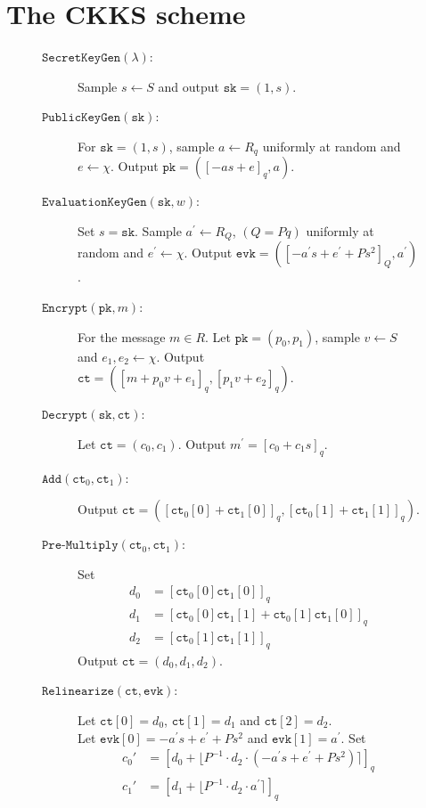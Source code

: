 \documentclass[a4paper,10pt]{article}
\begin{document}
\section{The CKKS scheme \cite{cheon2017homomorphic}}
\begin{figure}[h]
	\begin{description}	
		\item[$\texttt{SecretKeyGen}(\lambda)$:] Sample $s \leftarrow S$ and 
	output \( \texttt{sk}=(1,s)\). 
		
		\item[$\texttt{PublicKeyGen}(\texttt{sk})$:]   For $\texttt{sk}=(1,s)$, sample $a \leftarrow R_{q}$
		uniformly at random and $e \leftarrow \chi$. Output \(\texttt{pk}=\left([-as + e]_q , a\right)\).
		
		\item[$\texttt{EvaluationKeyGen}(\texttt{sk}, w)$:]  Set $s = \texttt{sk}$. 
		Sample $a^\prime \leftarrow R_{Q}$, $(Q=Pq)$ uniformly at random and $e^\prime \leftarrow \chi$.
		Output \(\texttt{evk} = \left([-a^\prime s + e^\prime + Ps^2]_{Q} , a^\prime \right)\).
		
		\item[$\texttt{Encrypt}(\texttt{pk},m)$:] For the message $m \in R$. Let $\texttt{pk} = 
		(p_0,p_1)$, sample $v \leftarrow S$ and $e_1,e_2 \leftarrow \chi$. Output
		\( \texttt{ct} = \left([m + p_0 v + e_1]_q , [p_1 v + e_2]_q \right)\).
		
		\item[$\texttt{Decrypt}(\texttt{sk},\texttt{ct})$:]   Let $\texttt{ct} = (c_0,c_1)$. Output
		$m^\prime = [c_0+ c_1 s]_q$.
		
		\item[$\texttt{Add}(\texttt{ct}_0,\texttt{ct}_1)$:]  Output 
		\( \texttt{ct} = ([\texttt{ct}_0[0] + \texttt{ct}_1[0]]_q, [\texttt{ct}_0[1] + \texttt{ct}_1[1]]_q)\).
		
		\item[$\texttt{Pre-Multiply}(\texttt{ct}_0,\texttt{ct}_1)$:]  Set
		\begin{align*}
		d_0 &= \left[ \texttt{ct}_0[0]\texttt{ct}_1[0] \right]_q \\
		d_1 &= \left[\texttt{ct}_0[0]\texttt{ct}_1[1] + \texttt{ct}_0[1]\texttt{ct}_1[0]\right]_q\\
		d_2 &= \left[ \texttt{ct}_0[1]\texttt{ct}_1[1] \right]_q
		\end{align*}
		Output $\texttt{ct} = (d_0, d_1, d_2)$.
		
		\item[$\texttt{Relinearize}(\texttt{ct},\texttt{evk})$:] 
		Let $\texttt{ct}[0] = d_0$, $\texttt{ct}[1] = d_1$ and $\texttt{ct}[2] = d_2$. \\
		Let $\texttt{evk}[0] = -a^\prime s + e^\prime + Ps^2$ and $\texttt{evk}[1] = a^\prime$.
		Set
 		\begin{align*}
         c_0' &= [d_0 + \lfloor P^{-1} \cdot d_2 \cdot (-a^\prime s + e^\prime + Ps^2) \rceil ]_q \\
         c_1' &= [d_1 + \lfloor P^{-1} \cdot d_2 \cdot a^\prime \rceil ]_q
        \end{align*}


\end{description}
\end{figure}
\end{document}
